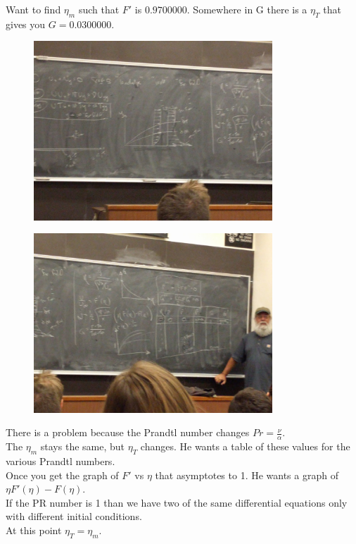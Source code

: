 \documentclass{article}
\begin{document}
Want to find $\eta_m$ such that $F'$ is $0.9700000$. Somewhere in G there is a $\eta_T$ that gives you $G=0.0300000$.\\
\begin{figure}[h!]
    \centering
    \includegraphics[width=0.8\textwidth,clip=true,trim={17cm 15cm 15cm 14cm}]{proj21.jpg}
\end{figure}
\begin{figure}[h!]
    \centering
    \includegraphics[width=0.8\textwidth,clip=true,trim={22cm 9cm 7cm 15cm}]{proj22.jpg}
\end{figure}

There is a problem because the Prandtl number changes $Pr=\frac{\nu}{\alpha}$.\\
The $\eta_m$ stays the same, but $\eta_T$ changes. He wants a table of these values for the various Prandtl numbers.\\
Once you get the graph of $F'$ vs $\eta$ that asymptotes to 1. He wants a graph of $\eta F'(\eta)-F(\eta)$.\\
If the PR number is 1 than we have two of the same differential equations only with different initial conditions.\\
At this point $\eta_T=\eta_m$.\\
\end{document}

